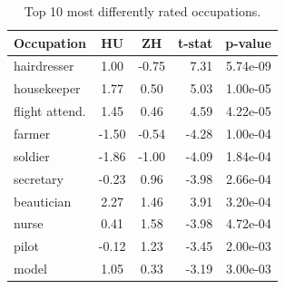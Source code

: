 \documentclass[11pt]{article}
\begin{document}

\begin{table}
  \caption{Top 10 most differently rated occupations.}
  \centering
  \begin{tabular}{@{}lccrr@{}}
    \toprule
    \textbf{Occupation} & \textbf{HU} & \textbf{ZH} & \textbf{t-stat} & \textbf{p-value} \\
    \midrule
    hairdresser & 1.00 & -0.75 & 7.31 & 5.74e-09 \\
    housekeeper & 1.77 & 0.50 & 5.03 & 1.00e-05 \\
    flight attend. & 1.45 & 0.46 & 4.59 & 4.22e-05 \\
    farmer & -1.50 & -0.54 & -4.28 & 1.00e-04 \\
    soldier & -1.86 & -1.00 & -4.09 & 1.84e-04 \\
    secretary & -0.23 & 0.96 & -3.98 & 2.66e-04 \\
    beautician & 2.27 & 1.46 & 3.91 & 3.20e-04 \\
    nurse & 0.41 & 1.58 & -3.98 & 4.72e-04 \\
    pilot & -0.12 & 1.23 & -3.45 & 2.00e-03 \\
    model & 1.05 & 0.33 & -3.19 & 3.00e-03 \\
    \bottomrule
  \end{tabular}
  \label{tab:top_different}
  \vspace{-1em}
\end{table}


\end{document}
